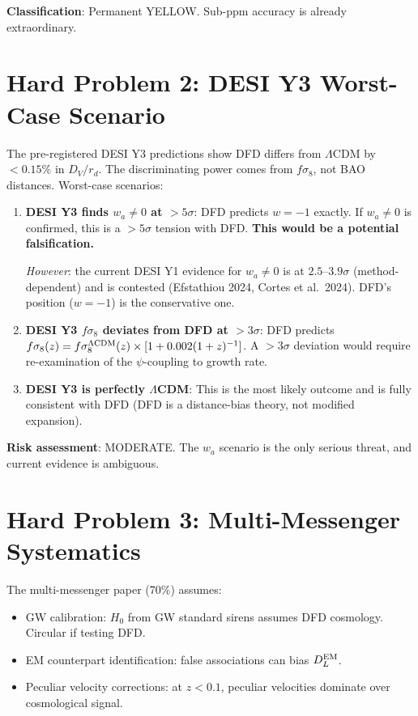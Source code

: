 \documentclass[11pt,a4paper]{article}
\begin{document}
\textbf{Classification}: Permanent YELLOW. Sub-ppm accuracy is already extraordinary.

\section{Hard Problem 2: DESI Y3 Worst-Case Scenario}

The pre-registered DESI Y3 predictions show DFD differs from $\Lambda$CDM by $< 0.15\%$ in $D_V/r_d$. The discriminating power comes from $f\sigma_8$, not BAO distances. Worst-case scenarios:

\begin{enumerate}[nosep]
\item \textbf{DESI Y3 finds $w_a \neq 0$ at $> 5\sigma$}: DFD predicts $w = -1$ exactly. If $w_a \neq 0$ is confirmed, this is a $> 5\sigma$ tension with DFD. \textbf{This would be a potential falsification.}

\textit{However}: the current DESI Y1 evidence for $w_a \neq 0$ is at $2.5$--$3.9\sigma$ (method-dependent) and is contested (Efstathiou 2024, Cortes et al.\ 2024). DFD's position ($w = -1$) is the conservative one.

\item \textbf{DESI Y3 $f\sigma_8$ deviates from DFD at $> 3\sigma$}: DFD predicts $f\sigma_8(z) = f\sigma_8^{\Lambda{\rm CDM}}(z) \times [1 + 0.002(1+z)^{-1}]$. A $> 3\sigma$ deviation would require re-examination of the $\psi$-coupling to growth rate.

\item \textbf{DESI Y3 is perfectly $\Lambda$CDM}: This is the most likely outcome and is fully consistent with DFD (DFD is a distance-bias theory, not modified expansion).
\end{enumerate}

\textbf{Risk assessment}: MODERATE. The $w_a$ scenario is the only serious threat, and current evidence is ambiguous.

\section{Hard Problem 3: Multi-Messenger Systematics}

The multi-messenger paper (70\%) assumes:
\begin{itemize}[nosep]
\item GW calibration: $H_0$ from GW standard sirens assumes DFD cosmology. Circular if testing DFD.
\item EM counterpart identification: false associations can bias $D_L^{\rm EM}$.
\item Peculiar velocity corrections: at $z < 0.1$, peculiar velocities dominate over cosmological signal.
\end{itemize}
\end{document}
